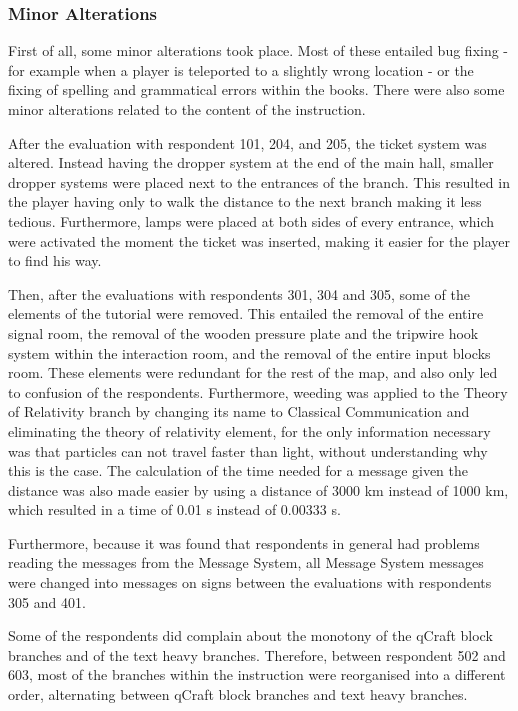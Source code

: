 \documentclass[11pt,twoside]{report} %
\begin{document}
\subsubsection{Minor Alterations}

First of all, some minor alterations took place. Most of these entailed bug fixing - for example when a player is teleported to a slightly wrong location - or the fixing of spelling and grammatical errors within the books. There were also some minor alterations related to the content of the instruction.

After the evaluation with respondent 101, 204, and 205, the ticket system was altered. Instead having the dropper system at the end of the main hall, smaller dropper systems were placed next to the entrances of the branch. This resulted in the player having only to walk the distance to the next branch making it less tedious. Furthermore, lamps were placed at both sides of every entrance, which were activated the moment the ticket was inserted, making it easier for the player to find his way.

Then, after the evaluations with respondents 301, 304 and 305, some of the elements of the tutorial were removed. This entailed the removal of the entire signal room, the removal of the wooden pressure plate and the tripwire hook system within the interaction room, and the removal of the entire input blocks room. These elements were redundant for the rest of the map, and also only led to confusion of the respondents. Furthermore, weeding was applied to the Theory of Relativity branch by changing its name to Classical Communication and eliminating the theory of relativity element, for the only information necessary was that particles can not travel faster than light, without understanding why this is the case. The calculation of the time needed for a message given the distance was also made easier by using a distance of 3000 km instead of 1000 km, which resulted in a time of 0.01 s instead of 0.00333 s.

Furthermore, because it was found that respondents in general had problems reading the messages from the Message System, all Message System messages were changed into messages on signs between the evaluations with respondents 305 and 401.

Some of the respondents did complain about the monotony of the qCraft block branches and of the text heavy branches. Therefore, between respondent 502 and 603, most of the branches within the instruction were reorganised into a different order, alternating between qCraft block branches and text heavy branches.
\end{document}
